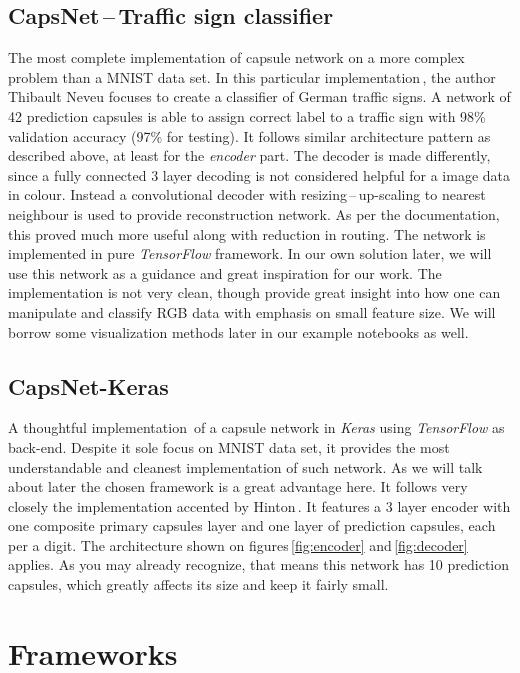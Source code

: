 \subsection{CapsNet\,--\,Traffic sign classifier}
\label{ss:traffic_signs}

The most complete implementation of capsule network on a more complex problem than a MNIST data set. In this particular implementation\,\cite{capsnet_traffic}, the author Thibault Neveu focuses to create a classifier of German traffic signs. A network of 42 prediction capsules is able to assign correct label to a traffic sign with 98\% validation accuracy (97\% for testing). It follows similar architecture pattern as described above, at least for the \textit{encoder} part. The decoder is made differently, since a fully connected 3 layer decoding is not considered helpful for a image data in colour. Instead a convolutional decoder with resizing\,--\,up-scaling to nearest neighbour is used to provide reconstruction network. As per the documentation, this proved much more useful along with reduction in routing. The network is implemented in pure \textit{TensorFlow} framework. In our own solution later, we will use this network as a guidance and great inspiration for our work. The implementation is not very clean, though provide great insight into how one can manipulate and classify RGB data with emphasis on small feature size. We will borrow some visualization methods later in our example notebooks as well.

\subsection{CapsNet-Keras}

A thoughtful implementation\,\cite{capsnet_keras} of a capsule network in \textit{Keras} using \textit{TensorFlow} as back-end. Despite it sole focus on MNIST data set, it provides the most understandable and cleanest implementation of such network. As we will talk about later the chosen framework is a great advantage here. It follows very closely the implementation accented by Hinton\,\cite{capsule}. It features a 3 layer encoder with one composite primary capsules layer and one layer of prediction capsules, each per a digit. The architecture shown on figures\,\ref{fig:encoder} and\,\ref{fig:decoder} applies. As you may already recognize, that means this network has 10 prediction capsules, which greatly affects its size and keep it fairly small.

\section{Frameworks}

